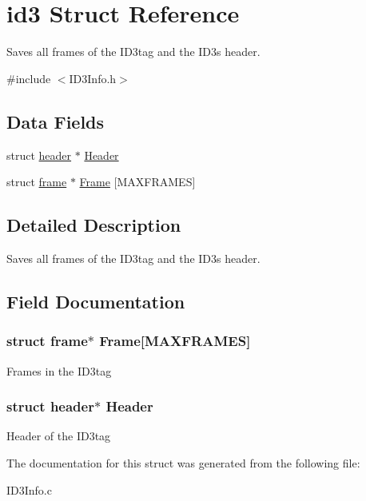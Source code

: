 \hypertarget{structid3}{\section{id3 Struct Reference}
\label{structid3}
}


Saves all frames of the I\-D3tag and the I\-D3s header.  




{\ttfamily \#include $<$I\-D3\-Info.\-h$>$}

\subsection*{Data Fields}
\begin{DoxyCompactItemize}
\item 
struct \hyperlink{structheader}{header} $\ast$ \hyperlink{structid3_a7cd48e0f727082b9b7d7064f52f21bec}{Header}
\item 
struct \hyperlink{structframe}{frame} $\ast$ \hyperlink{structid3_af5444c618ff77c4889611d58aed3035f}{Frame} \mbox{[}M\-A\-X\-F\-R\-A\-M\-E\-S\mbox{]}
\end{DoxyCompactItemize}


\subsection{Detailed Description}
Saves all frames of the I\-D3tag and the I\-D3s header. 

\subsection{Field Documentation}
\hypertarget{structid3_af5444c618ff77c4889611d58aed3035f}{
\subsubsection[{Frame}]{\setlength{\rightskip}{0pt plus 5cm}struct {\bf frame}$\ast$ Frame\mbox{[}M\-A\-X\-F\-R\-A\-M\-E\-S\mbox{]}}}\label{structid3_af5444c618ff77c4889611d58aed3035f}
Frames in the I\-D3tag \hypertarget{structid3_a7cd48e0f727082b9b7d7064f52f21bec}{
\subsubsection[{Header}]{\setlength{\rightskip}{0pt plus 5cm}struct {\bf header}$\ast$ Header}}\label{structid3_a7cd48e0f727082b9b7d7064f52f21bec}
Header of the I\-D3tag 

The documentation for this struct was generated from the following file\-:\begin{DoxyCompactItemize}
\item 
I\-D3\-Info.\-c\end{DoxyCompactItemize}
